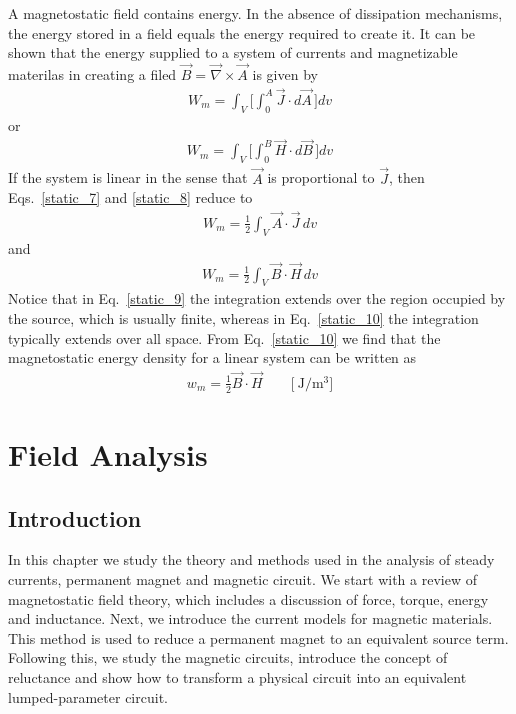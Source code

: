 \documentclass[12pt,a4paper,oneside]{book}
\begin{document}
\begin{onehalfspace}
A magnetostatic field contains energy. In the absence of dissipation mechanisms, the energy stored in a field equals the energy required to create it. It can be shown that the energy supplied to a system of currents and magnetizable materilas in creating a filed $\vec{B}=\vec{\nabla}\times\vec{A}$ is given by 
 \begin{equation}\label{static_7}
 	\begin{aligned}
		W_m =\int_{V}\Bigg[\int_{0}^{A}\vec{J}\cdot d\vec{A}\,\Bigg]dv
 	\end{aligned}
 \end{equation} 
or
 \begin{equation}\label{static_8}
	\begin{aligned}
		W_m =\int_{V}\Bigg[\int_{0}^{B}\vec{H}\cdot d\vec{B}\,\Bigg]dv
	\end{aligned}
\end{equation} 
If the system is linear in the sense that $\vec{A}$ is proportional to $\vec{J}$, then Eqs.~\eqref{static_7} and \ref{static_8} reduce to
 \begin{equation}\label{static_9}
	\begin{aligned}
		W_m =\frac{1}{2}\int_{V}\vec{A}\cdot \vec{J}\,dv
	\end{aligned}
\end{equation} 
and
 \begin{equation}\label{static_10}
	\begin{aligned}
		W_m =\frac{1}{2}\int_{V}\vec{B}\cdot \vec{H}\,dv
	\end{aligned}
\end{equation} 
Notice that in Eq.~\eqref{static_9} the integration extends over the region occupied by the source, which is usually finite, whereas in Eq.~\eqref{static_10} the integration typically extends over all space. From Eq.~\eqref{static_10} we find that the magnetostatic energy density for a linear system can be written as
\begin{equation}\label{static_11}
	\begin{aligned}
		w_m =\frac{1}{2}\vec{B}\cdot \vec{H}\qquad\Big[\SI{}{\joule\per\cubic\meter}\Big]
	\end{aligned}
\end{equation} 

\chapter{Field Analysis}
\section{Introduction}
In this chapter we study the theory and methods used in the analysis of steady currents, permanent magnet and magnetic circuit. We start with a review of magnetostatic field theory, which includes a discussion of force, torque, energy  and inductance. Next, we introduce the current models for magnetic materials. This method is used to reduce a permanent magnet to an equivalent source term. Following this, we study the magnetic circuits, introduce the concept of reluctance and show how to transform a physical circuit into an equivalent lumped-parameter circuit. 

\end{onehalfspace}
\end{document}
